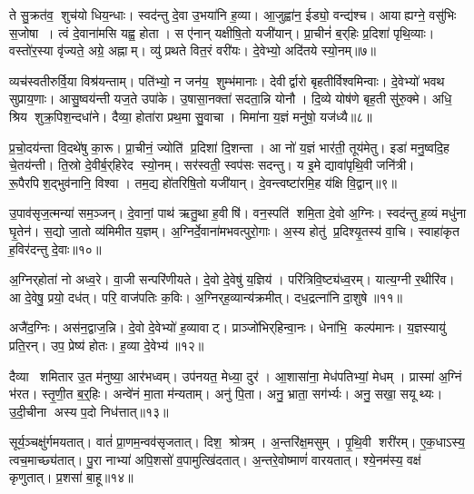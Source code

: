 ते सु॒क्रत॑व॒ शुच॑यो धिय॒न्धाः। स्वद॑न्तु दे॒वा उ॒भया॑नि ह॒व्या। आ॒जुह्वा॑न॒ ईड्यो॒ वन्द्य॑श्च। आयाह्यग्ने॒ वसु॑भिः स॒जोषा। त्वं दे॒वाना॑मसि यह्व॒ होता। स ए॑नान् यक्षीषि॒तो यजी॑यान्। प्रा॒चीनं॑ ब॒र्‌हिः प्र॒दिशा॑ पृथि॒व्याः। वस्तो॑र॒स्या वृ॑ज्यते॒ अग्रे॒ अह्नाम्। व्यु॑ प्रथते वित॒रं वरी॑यः। दे॒वेभ्यो॒ अदि॑तये स्यो॒नम्॥७॥

व्यच॑स्वतीरुर्वि॒या विश्र॑यन्ताम्। पति॑भ्यो॒ न जन॑य॒ शुम्भ॑मानाः। देवीर्द्वारो बृहतीर्विश्वमिन्वाः। दे॒वेभ्यो॑ भवथ सुप्राय॒णाः। आसु॒ष्वय॑न्ती यज॒ते उपा॑के। उ॒षासा॒नक्ता॑ सदता॒न्नि योनौ। दि॒व्ये योष॑णे बृह॒ती सु॑रु॒क्मे। अधि॒ श्रिय शुक्र॒पिश॒न्दधा॑ने। दैव्या॒ होता॑रा प्रथ॒मा सु॒वाचा। मिमा॑ना य॒ज्ञं मनु॑षो॒ यज॑ध्यै॥८॥

प्र॒चो॒दय॑न्ता वि॒दथे॑षु का॒रू। प्रा॒चीनं॒ ज्योति॑ प्र॒दिशा॑ दि॒शन्ता। आ नो॑ य॒ज्ञं भार॑ती॒ तूय॑मेतु। इडा॑ मनु॒ष्वदि॒ह चे॒तय॑न्ती। ति॒स्रो दे॒वीर्ब॒र्‌हिरेद स्यो॒नम्। सर॑स्वती॒ स्वप॑सः सदन्तु। य इ॒मे द्यावा॑पृथि॒वी जनि॑त्री। रू॒पैरपिश॒द्भुव॑नानि॒ विश्वा। तम॒द्य हो॑तरिषि॒तो यजी॑यान्। दे॒वन्त्वष्टा॑रमि॒ह य॑क्षि वि॒द्वान्॥९॥

उ॒पाव॑सृज॒त्मन्या॑ सम॒ञ्जन्। दे॒वानां॒ पाथ॑ ऋतु॒था ह॒वीषि॑। वन॒स्पति॑ शमि॒ता दे॒वो अ॒ग्निः। स्वद॑न्तु ह॒व्यं मधु॑ना घृ॒तेन॑। स॒द्यो जा॒तो व्य॑मिमीत य॒ज्ञम्। अ॒ग्निर्दे॒वाना॑मभवत्पुरो॒गाः। अ॒स्य होतु॑ प्र॒दिश्यृ॒तस्य॑ वा॒चि। स्वाहा॑कृत ह॒विर॑दन्तु दे॒वाः॥१०॥\anuvakamend[य॒ज्ञैः स्यो॒नं यज॑ध्यै वि॒द्वान॒ष्टौ च॑]

अ॒ग्निर्‌होता॑ नो अध्व॒रे। वा॒जी सन्परि॑णीयते। दे॒वो दे॒वेषु॑ य॒ज्ञिय॑। परि॑त्रिवि॒ष्ट्य॑ध्व॒रम्। यात्य॒ग्नी र॒थीरि॑व। आ दे॒वेषु॒ प्रयो॒ दध॑त्। परि॒ वाज॑पतिः क॒विः। अ॒ग्निर्‌ह॒व्यान्य॑क्रमीत्। दध॒द्रत्ना॑नि दा॒शुषे॥११॥\anuvakamend[अ॒ग्निर्‌होता॑ नो॒ नव॑]

अजै॑द॒ग्निः। अस॑न॒द्वाज॒न्नि। दे॒वो दे॒वेभ्यो॑ ह॒व्यावाट्। प्राञ्जो॑भिर्‌हिन्वा॒नः। धेना॑भि॒ कल्प॑मानः। य॒ज्ञस्यायु॑ प्रति॒रन्। उप॒ प्रेष्य॑ होतः। ह॒व्या दे॒वेभ्य॑॥१२॥\anuvakamend[अजै॑द॒ष्टौ]

दैव्या शमितार उ॒त म॑नुष्या॒ आर॑भध्वम्। उप॑नयत॒ मेध्या॒ दुर॑। आ॒शासा॑ना॒ मेध॑पतिभ्यां॒ मेधम्। प्रास्मा॑ अ॒ग्निं भ॑रत। स्तृ॒णी॒त ब॒र्॒हिः। अन्वे॑नं मा॒ता म॑न्यताम्। अनु॑ पि॒ता। अनु॒ भ्राता॒ सग॑र्भ्यः। अनु॒ सखा॒ सयूथ्यः। उ॒दी॒चीना अस्य प॒दो निध॑त्तात्॥१३॥

सूर्य॒ञ्चक्षु॑र्गमयतात्। वातं॑ प्रा॒णम॒न्वव॑सृजतात्। दिश॒ श्रोत्रम्। अ॒न्तरि॑क्ष॒मसुम्। पृ॒थि॒वी शरी॑रम्। ए॒क॒धाऽस्य॒ त्वच॒माच्छ्य॑तात्। पु॒रा नाभ्या॑ अपि॒शसो॑ व॒पामुत्खि॑दतात्। अ॒न्तरे॒वोष्माणं॑ वारयतात्। श्ये॒नम॑स्य॒ वक्ष॑ कृणुतात्। प्र॒शसा॑ बा॒हू॥१४॥

